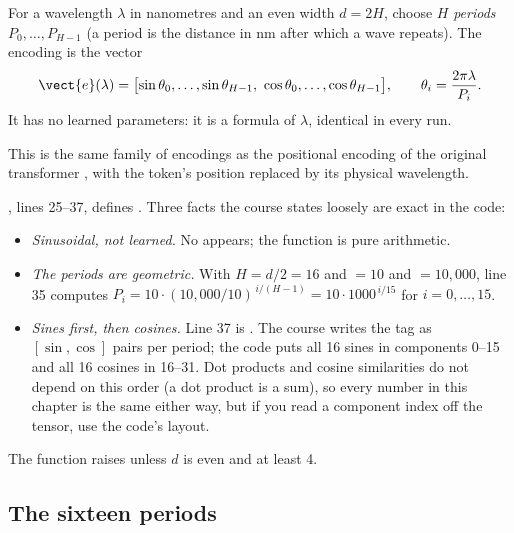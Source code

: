 \begin{definition}
For a wavelength $\lambda$ in nanometres and an even width $d = 2H$, choose $H$ \emph{periods} $P_0, \ldots, P_{H-1}$ (a period is the distance in nm after which a wave repeats). The encoding is the vector
\begin{equation}\label{eq:ceiling:enc}
  \vect{e}(\lambda) = \bigl[\sin\theta_0, \ldots, \sin\theta_{H-1},\ \cos\theta_0, \ldots, \cos\theta_{H-1}\bigr],\qquad \theta_i = \frac{2\pi\lambda}{P_i}.
\end{equation}
It has no learned parameters: it is a formula of $\lambda$, identical in every run.
\end{definition}

This is the same family of encodings as the positional encoding of the original transformer \citep{vaswani2017attention}, with the token's position replaced by its physical wavelength.

\begin{sourcenote}
, lines 25--37, defines . Three facts the course states loosely are exact in the code:
\begin{itemize}
\item \emph{Sinusoidal, not learned.} No  appears; the function is pure arithmetic.
\item \emph{The periods are geometric.} With $H = d/2 = 16$ and  $= 10$ and  $= 10{,}000$, line 35 computes
$P_i = 10\cdot(10{,}000/10)^{\,i/(H-1)} = 10\cdot 1000^{\,i/15}$ for $i = 0, \ldots, 15$.
\item \emph{Sines first, then cosines.} Line 37 is . The course writes the tag as $[\sin, \cos]$ pairs per period; the code puts all 16 sines in components 0--15 and all 16 cosines in 16--31. Dot products and cosine similarities do not depend on this order (a dot product is a sum), so every number in this chapter is the same either way, but if you read a component index off the tensor, use the code's layout.
\end{itemize}
The function raises  unless $d$ is even and at least 4.
\end{sourcenote}

\subsection{The sixteen periods}

